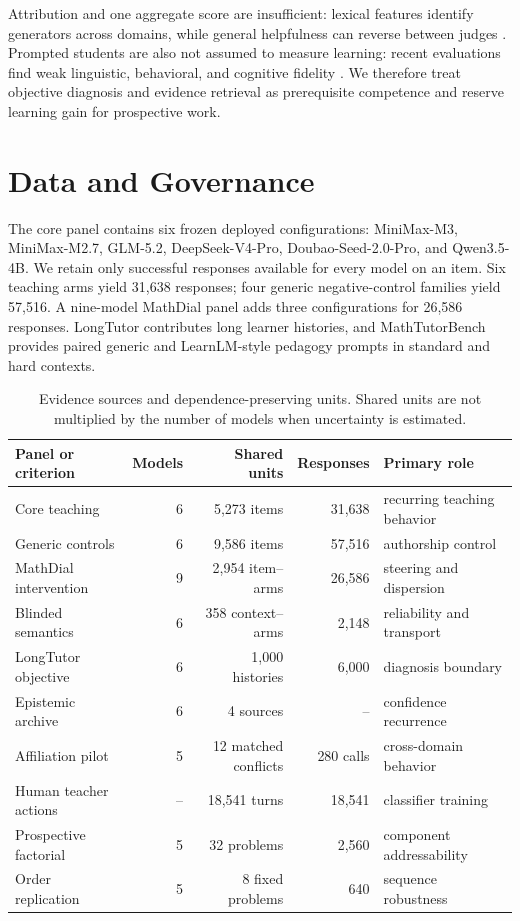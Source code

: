 \documentclass[11pt]{article}
\begin{document}
Attribution and one aggregate score are insufficient: lexical features identify
generators across domains, while general helpfulness can reverse between judges
\citep{mcgovern-etal-2025-fingerprints,fan-etal-2026-helpfulness}. Prompted students are
also not assumed to measure learning: recent evaluations find weak linguistic,
behavioral, and cognitive fidelity \citep{scarlatos-etal-2026-simulated}. We
therefore treat objective diagnosis and evidence retrieval as prerequisite
competence and reserve learning gain for prospective work.

\section{Data and Governance}

The core panel contains six frozen deployed configurations: MiniMax-M3,
MiniMax-M2.7, GLM-5.2, DeepSeek-V4-Pro, Doubao-Seed-2.0-Pro, and Qwen3.5-4B. We
retain only successful responses available for every model on an item. Six
teaching arms yield 31,638 responses; four generic negative-control families
yield 57,516. A nine-model MathDial panel adds three configurations for 26,586
responses. LongTutor contributes long learner histories, and MathTutorBench
provides paired generic and LearnLM-style pedagogy prompts in standard and hard
contexts.

\begin{table}[t]
  \centering
  \small
  \begin{tabular}{lrrrl}
    \toprule
    \textbf{Panel or criterion} & \textbf{Models} & \textbf{Shared units} & \textbf{Responses} & \textbf{Primary role} \\
    \midrule
    Core teaching & 6 & 5,273 items & 31,638 & recurring teaching behavior \\
    Generic controls & 6 & 9,586 items & 57,516 & authorship control \\
    MathDial intervention & 9 & 2,954 item--arms & 26,586 & steering and dispersion \\
    Blinded semantics & 6 & 358 context--arms & 2,148 & reliability and transport \\
    LongTutor objective & 6 & 1,000 histories & 6,000 & diagnosis boundary \\
    Epistemic archive & 6 & 4 sources & -- & confidence recurrence \\
    Affiliation pilot & 5 & 12 matched conflicts & 280 calls & cross-domain behavior \\
    Human teacher actions & -- & 18,541 turns & 18,541 & classifier training \\
    Prospective factorial & 5 & 32 problems & 2,560 & component addressability \\
    Order replication & 5 & 8 fixed problems & 640 & sequence robustness \\
    \bottomrule
  \end{tabular}
  \caption{Evidence sources and dependence-preserving units. Shared units are
  not multiplied by the number of models when uncertainty is estimated.}
  \label{tab:data}
\end{table}
\end{document}
